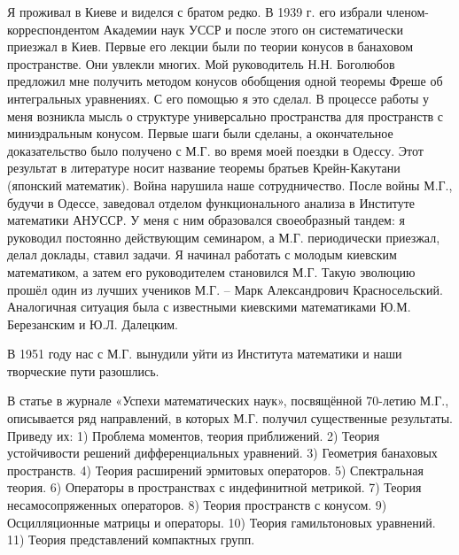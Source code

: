 Я проживал в Киеве и виделся с братом редко. В 1939 г. его избрали членом-корреспондентом Академии наук УССР и после этого он систематически приезжал в Киев. Первые его лекции были по теории конусов в банаховом пространстве. Они увлекли многих. Мой руководитель Н.Н. Боголюбов предложил мне получить методом конусов обобщения одной теоремы Фреше об интегральных уравнениях. С его помощью я это сделал. В процессе работы у меня возникла мысль о структуре универсально пространства для пространств с миниэдральным конусом. Первые шаги были сделаны, а окончательное доказательство было получено с М.Г. во время моей поездки в Одессу. Этот результат в литературе носит название теоремы братьев Крейн-Какутани (японский математик).
Война нарушила наше сотрудничество. После войны М.Г., будучи в Одессе, заведовал отделом функционального анализа в Институте математики АН\linebreak УССР. У меня с ним образовался своеобразный тандем: я руководил постоянно действующим семинаром, а М.Г. периодически приезжал, делал доклады, ставил задачи. Я начинал работать с молодым киевским математиком, а затем его руководителем становился М.Г. Такую эволюцию прошёл один из лучших учеников М.Г.  – Марк Александрович Красносельский. Аналогичная ситуация была с известными киевскими математиками Ю.М. Березанским и Ю.Л. Далецким.

В 1951 году нас с М.Г. вынудили уйти из Института математики и наши творческие пути разошлись.

В статье в журнале «Успехи математических наук», посвящённой 70-летию М.Г., описывается ряд направлений, в которых М.Г. получил существенные результаты. Приведу их:  1) Проблема моментов, теория приближений. 2) Теория устойчивости решений дифференциальных уравнений. 3) Геометрия банаховых пространств. 4) Теория расширений эрмитовых операторов. 5) Спектральная теория. 6) Операторы в пространствах с индефинитной метрикой. 7) Теория несамосопряженных операторов. 8) Теория пространств с конусом. 9) Осцилляционные матрицы и операторы. 10) Теория гамильтоновых уравнений. 11) Теория представлений компактных групп.

